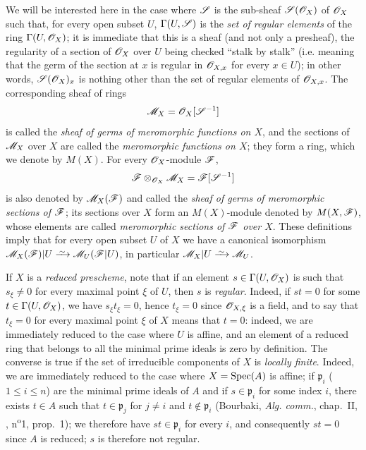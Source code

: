 \begin{env}[20.1.3]\label{IV.20.1.3}
We will be interested here in the case where $\mathscr{S}$ is the sub-sheaf $\mathscr{S}(\mathscr{O}_X)$ of $\mathscr{O}_X$ such that, for every open subset $U$, $\Gamma(U,\mathscr{S})$ is the \emph{set of regular elements} of the ring $\Gamma(U,\mathscr{O}_X)$; it is immediate that this is a sheaf (and not only a presheaf), the regularity of a section of $\mathscr{O}_X$ over $U$ being checked ``stalk by stalk'' (i.e. meaning that the germ of the section at $x$ is regular in $\mathscr{O}_{X,x}$ for every $x\in U$); in other words, $\mathscr{S}(\mathscr{O}_X)_x$ is nothing other than the set of regular elements of $\mathscr{O}_{X,x}$.
The corresponding sheaf of rings
\[
  \mathscr{M}_X=\mathscr{O}_X[\mathscr{S}^{-1}]
\]
is called the \emph{sheaf of germs of meromorphic functions on $X$}, and the sections of $\mathscr{M}_X$ over $X$ are called the \emph{meromorphic functions on $X$}; they form a ring, which we denote by $M(X)$.
For every $\mathscr{O}_X$-module $\mathscr{F}$,
\[
  \mathscr{F}\otimes_{\mathscr{O}_X}\mathscr{M}_X=\mathscr{F}[\mathscr{S}^{-1}]
\]
is also denoted by $\mathscr{M}_X(\mathscr{F})$ and called the \emph{sheaf of germs of meromorphic sections of $\mathscr{F}$}; its sections over $X$ form an $M(X)$-module denoted by $M(X,\mathscr{F})$, whose elements are called \emph{meromorphic sections of $\mathscr{F}$ over $X$}.
These definitions imply that for every open subset $U$ of $X$ we have a canonical isomorphism $\sh{M}_X(\sh{F})|U\isoto\sh{M}_U(\sh{F}|U)$, in particular $\sh{M}_X|U\isoto\sh{M}_U$.
\end{env}

\begin{env}[20.1.3.1]
\label{IV.20.1.3.1}
If $X$ is a \emph{reduced prescheme}, note that if an element $s\in\Gamma(U,\mathscr{O}_X)$ is such that $s_\xi\neq0$ for every maximal point $\xi$ of $U$, then $s$ is \emph{regular}.
Indeed, if $st=0$ for some $t\in\Gamma(U,\mathscr{O}_X)$, we have $s_\xi t_\xi=0$, hence $t_\xi=0$ since $\mathscr{O}_{X,\xi}$ is a field, and to say that $t_\xi=0$ for every maximal point $\xi$ of $X$ means that $t=0$: indeed, we are immediately reduced to the case where $U$ is affine, and an element of a reduced ring that belongs to all the minimal prime ideals is zero by definition.
The converse is true if the set of irreducible components of $X$ is \emph{locally finite}.
Indeed, we are immediately reduced to the case where $X=\operatorname{Spec}(A)$ is affine; if $\mathfrak p_i$ ($1\leq i\leq n$) are the minimal prime ideals of $A$ and if $s\in\mathfrak p_i$ for some index $i$, there exists $t\in A$ such that $t\in\mathfrak p_j$ for $j\neq i$ and $t\notin\mathfrak p_i$ (Bourbaki, \emph{Alg. comm.}, chap.~II, , n\textsuperscript{o}1, prop.~1); we therefore have $st\in\mathfrak p_i$ for every $i$, and consequently $st=0$ since $A$ is reduced; $s$ is therefore not regular.
\end{env}

